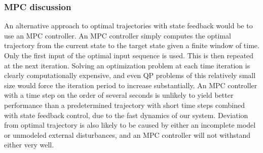 \subsubsection{MPC discussion}

An alternative approach to optimal trajectories with state feedback would be to use an MPC controller. An MPC controller simply computes the optimal trajectory from the current state to the target state given a finite window of time. Only the first input of the optimal input sequence is used. This is then repeated at the next iteration. Solving an optimization problem at each time iteration is clearly computationally expensive, and even QP problems of this relatively small size would force the iteration period to increase substantially. An MPC controller with a time step on the order of several seconds is unlikely to yield better performance than a predetermined trajectory with short time steps combined with state feedback control, due to the fast dynamics of our system. Deviation from optimal trajectory is also likely to be caused by either an incomplete model or unmodeled external disturbances, and an MPC controller will not withstand either very well. 








